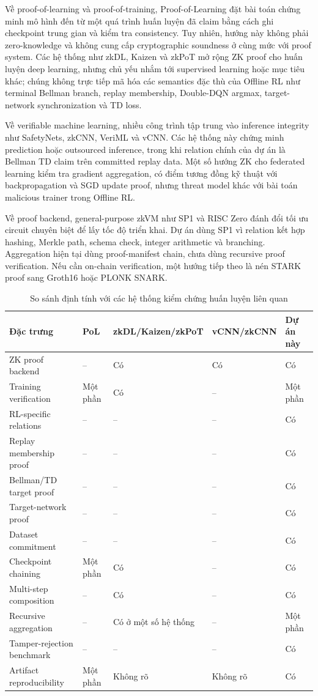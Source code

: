 \documentclass[12pt,a4paper,oneside]{report}
\begin{document}
Về proof-of-learning và proof-of-training, Proof-of-Learning đặt bài toán chứng minh mô hình đến từ một quá trình huấn luyện đã claim bằng cách ghi checkpoint trung gian và kiểm tra consistency. Tuy nhiên, hướng này không phải zero-knowledge và không cung cấp cryptographic soundness ở cùng mức với proof system. Các hệ thống như zkDL, Kaizen và zkPoT mở rộng ZK proof cho huấn luyện deep learning, nhưng chủ yếu nhắm tới supervised learning hoặc mục tiêu khác; chúng không trực tiếp mã hóa các semantics đặc thù của Offline RL như terminal Bellman branch, replay membership, Double-DQN argmax, target-network synchronization và TD loss.

Về verifiable machine learning, nhiều công trình tập trung vào inference integrity như SafetyNets, zkCNN, VeriML và vCNN. Các hệ thống này chứng minh prediction hoặc outsourced inference, trong khi relation chính của dự án là Bellman TD claim trên committed replay data. Một số hướng ZK cho federated learning kiểm tra gradient aggregation, có điểm tương đồng kỹ thuật với backpropagation và SGD update proof, nhưng threat model khác với bài toán malicious trainer trong Offline RL.

Về proof backend, general-purpose zkVM như SP1 và RISC Zero đánh đổi tối ưu circuit chuyên biệt để lấy tốc độ triển khai. Dự án dùng SP1 vì relation kết hợp hashing, Merkle path, schema check, integer arithmetic và branching. Aggregation hiện tại dùng proof-manifest chain, chưa dùng recursive proof verification. Nếu cần on-chain verification, một hướng tiếp theo là nén STARK proof sang Groth16 hoặc PLONK SNARK.

\begin{table}[H]
\centering
\caption{So sánh định tính với các hệ thống kiểm chứng huấn luyện liên quan}
\scriptsize
\begin{tabularx}{\textwidth}{p{} Y Y Y Y}
\toprule
Đặc trưng & PoL & zkDL/Kaizen/zkPoT & vCNN/zkCNN & Dự án này \\
\midrule
ZK proof backend & -- & Có & Có & Có \\
Training verification & Một phần & Có & -- & Một phần \\
RL-specific relations & -- & -- & -- & Có \\
Replay membership proof & -- & -- & -- & Có \\
Bellman/TD target proof & -- & -- & -- & Có \\
Target-network proof & -- & -- & -- & Có \\
Dataset commitment & -- & -- & -- & Có \\
Checkpoint chaining & Một phần & Có & -- & Có \\
Multi-step composition & -- & Có & -- & Có \\
Recursive aggregation & -- & Có ở một số hệ thống & -- & Một phần \\
Tamper-rejection benchmark & -- & -- & -- & Có \\
Artifact reproducibility & Một phần & Không rõ & Không rõ & Có \\
\bottomrule
\end{tabularx}
\end{table}
\end{document}
